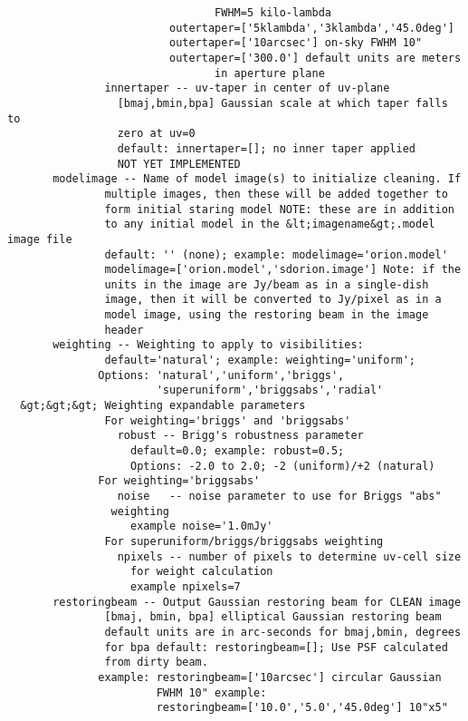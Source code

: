 \begin{verbatim}
                                FWHM=5 kilo-lambda
                         outertaper=['5klambda','3klambda','45.0deg']
                         outertaper=['10arcsec'] on-sky FWHM 10"
                         outertaper=['300.0'] default units are meters 
                                in aperture plane
               innertaper -- uv-taper in center of uv-plane
                 [bmaj,bmin,bpa] Gaussian scale at which taper falls to 
                 zero at uv=0
                 default: innertaper=[]; no inner taper applied
                 NOT YET IMPLEMENTED                
       modelimage -- Name of model image(s) to initialize cleaning. If
               multiple images, then these will be added together to
               form initial staring model NOTE: these are in addition
               to any initial model in the &lt;imagename&gt;.model image file
               default: '' (none); example: modelimage='orion.model'
               modelimage=['orion.model','sdorion.image'] Note: if the
               units in the image are Jy/beam as in a single-dish
               image, then it will be converted to Jy/pixel as in a
               model image, using the restoring beam in the image
               header
       weighting -- Weighting to apply to visibilities:
               default='natural'; example: weighting='uniform';
              Options: 'natural','uniform','briggs', 
                       'superuniform','briggsabs','radial'
  &gt;&gt;&gt; Weighting expandable parameters
               For weighting='briggs' and 'briggsabs'
                 robust -- Brigg's robustness parameter
                   default=0.0; example: robust=0.5;
                   Options: -2.0 to 2.0; -2 (uniform)/+2 (natural)
              For weighting='briggsabs'
                 noise   -- noise parameter to use for Briggs "abs" 
                weighting
                   example noise='1.0mJy'
               For superuniform/briggs/briggsabs weighting
                 npixels -- number of pixels to determine uv-cell size
                   for weight calculation
                   example npixels=7
       restoringbeam -- Output Gaussian restoring beam for CLEAN image
               [bmaj, bmin, bpa] elliptical Gaussian restoring beam
               default units are in arc-seconds for bmaj,bmin, degrees
               for bpa default: restoringbeam=[]; Use PSF calculated
               from dirty beam. 
              example: restoringbeam=['10arcsec'] circular Gaussian 
                       FWHM 10" example:
                       restoringbeam=['10.0','5.0','45.0deg'] 10"x5" 

\end{verbatim}
